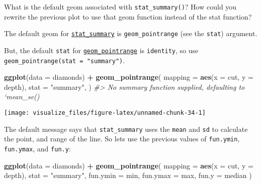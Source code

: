 \documentclass[]{book}
\newenvironment{Shaded}{\begin{snugshade}}{\end{snugshade}}
\newcommand{\CommentTok}[1]{\textcolor[rgb]{0.56,0.35,0.01}{\textit{#1}}}
\newcommand{\DataTypeTok}[1]{\textcolor[rgb]{0.13,0.29,0.53}{#1}}
\newcommand{\KeywordTok}[1]{\textcolor[rgb]{0.13,0.29,0.53}{\textbf{#1}}}
\newcommand{\NormalTok}[1]{#1}
\newcommand{\OperatorTok}[1]{\textcolor[rgb]{0.81,0.36,0.00}{\textbf{#1}}}
\newcommand{\StringTok}[1]{\textcolor[rgb]{0.31,0.60,0.02}{#1}}
\theoremstyle{definition}
\theoremstyle{definition}
\theoremstyle{definition}
\theoremstyle{remark}
\begin{document}
What is the default geom associated with \texttt{stat\_summary()}? How
could you rewrite the previous plot to use that geom function instead of
the stat function?

The default geom for
\href{http://docs.ggplot2.org/current/stat_summary.html}{\texttt{stat\_summary}}
is \texttt{geom\_pointrange} (see the \texttt{stat}) argument.

But, the default \texttt{stat} for
\href{http://docs.ggplot2.org/current/geom_linerange.html}{\texttt{geom\_pointrange}}
is \texttt{identity}, so use
\texttt{geom\_pointrange(stat\ =\ "summary")}.

\begin{Shaded}
\begin{Highlighting}[]
\KeywordTok{ggplot}\NormalTok{(}\DataTypeTok{data =}\NormalTok{ diamonds) }\OperatorTok{+}\StringTok{ }
\StringTok{  }\KeywordTok{geom_pointrange}\NormalTok{(}
    \DataTypeTok{mapping =} \KeywordTok{aes}\NormalTok{(}\DataTypeTok{x =}\NormalTok{ cut, }\DataTypeTok{y =}\NormalTok{ depth),}
    \DataTypeTok{stat =} \StringTok{"summary"}\NormalTok{,}
\NormalTok{  )}
\CommentTok{#> No summary function supplied, defaulting to `mean_se()}
\end{Highlighting}
\end{Shaded}

\begin{center}\texttt{[image: visualize\_files/figure-latex/unnamed-chunk-34-1]} \end{center}

The default message says that \texttt{stat\_summary} uses the
\texttt{mean} and \texttt{sd} to calculate the point, and range of the
line. So lets use the previous values of \texttt{fun.ymin},
\texttt{fun.ymax}, and \texttt{fun.y}:

\begin{Shaded}
\begin{Highlighting}[]
\KeywordTok{ggplot}\NormalTok{(}\DataTypeTok{data =}\NormalTok{ diamonds) }\OperatorTok{+}\StringTok{ }
\StringTok{  }\KeywordTok{geom_pointrange}\NormalTok{(}
    \DataTypeTok{mapping =} \KeywordTok{aes}\NormalTok{(}\DataTypeTok{x =}\NormalTok{ cut, }\DataTypeTok{y =}\NormalTok{ depth),}
    \DataTypeTok{stat =} \StringTok{"summary"}\NormalTok{,}
    \DataTypeTok{fun.ymin =}\NormalTok{ min,}
    \DataTypeTok{fun.ymax =}\NormalTok{ max,}
    \DataTypeTok{fun.y =}\NormalTok{ median}
\NormalTok{  )}
\end{Highlighting}
\end{Shaded}
\end{document}
